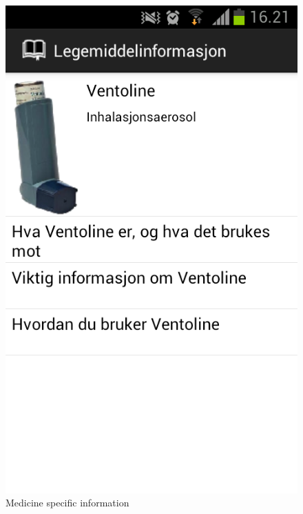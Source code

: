 \begin{figure}
\begin{minipage}[b]{0.4\linewidth}
		\includegraphics[width=0.20\paperwidth]{Pictures/Screenshots/specific_information.png}
	\caption{Medicine specific information}
	\label{fig:gapp-medicine-information}
	\end{minipage}
\end{figure}


